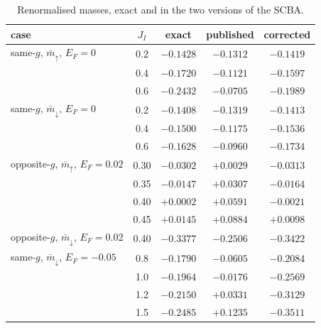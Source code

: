 \documentclass[11pt,a4paper]{article}
\newcommand{\up}{{\uparrow}}
\newcommand{\dn}{{\downarrow}}
\begin{document}
\begin{table}[t]
\centering
\caption{\label{t:masses}Renormalised masses, exact and in the two versions of the SCBA.}
\begin{tabular}{lcccc}
\toprule
case & $J_I$ & exact & published & corrected\\
\midrule
same-$g$, $\bar m_\up$, $E_F=0$ & 0.2 & $-0.1428$ & $-0.1312$ & $-0.1419$\\
 & 0.4 & $-0.1720$ & $-0.1121$ & $-0.1597$\\
 & 0.6 & $-0.2432$ & $-0.0705$ & $-0.1989$\\
same-$g$, $\bar m_\dn$, $E_F=0$ & 0.2 & $-0.1408$ & $-0.1319$ & $-0.1413$\\
 & 0.4 & $-0.1500$ & $-0.1175$ & $-0.1536$\\
 & 0.6 & $-0.1628$ & $-0.0960$ & $-0.1734$\\
opposite-$g$, $\bar m_\up$, $E_F=0.02$ & 0.30 & $-0.0302$ & $+0.0029$ & $-0.0313$\\
 & 0.35 & $-0.0147$ & $+0.0307$ & $-0.0164$\\
 & 0.40 & $+0.0002$ & $+0.0591$ & $-0.0021$\\
 & 0.45 & $+0.0145$ & $+0.0884$ & $+0.0098$\\
opposite-$g$, $\bar m_\dn$, $E_F=0.02$ & 0.40 & $-0.3377$ & $-0.2506$ & $-0.3422$\\
same-$g$, $\bar m_\dn$, $E_F=-0.05$ & 0.8 & $-0.1790$ & $-0.0605$ & $-0.2084$\\
 & 1.0 & $-0.1964$ & $-0.0176$ & $-0.2569$\\
 & 1.2 & $-0.2150$ & $+0.0331$ & $-0.3129$\\
 & 1.5 & $-0.2485$ & $+0.1235$ & $-0.3511$\\
\bottomrule
\end{tabular}
\end{table}
\end{document}
